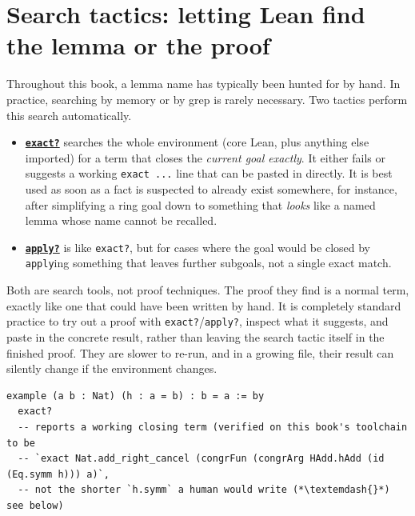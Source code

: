 \section{Search tactics: letting Lean find the lemma or the proof}\label{sec:12-working-efficiently:01-search-tactics:1}

Throughout this book, a lemma name has typically been hunted for by hand. In practice, searching by memory or by grep is rarely necessary. Two tactics perform this search automatically.

\begin{itemize}
\tightlist
\item
  \textbf{\href{https://lean-lang.org/doc/reference/latest/Tactic-Proofs/Tactic-Reference/}{\texttt{exact?}}} searches the whole environment (core Lean, plus anything else imported) for a term that closes the \emph{current goal exactly}. It either fails or suggests a working \texttt{exact ...} line that can be pasted in directly. It is best used as soon as a fact is suspected to already exist somewhere, for instance, after simplifying a ring goal down to something that \emph{looks} like a named lemma whose name cannot be recalled.
\item
  \textbf{\href{https://lean-lang.org/doc/reference/latest/Tactic-Proofs/Tactic-Reference/}{\texttt{apply?}}} is like \texttt{exact?}, but for cases where the goal would be closed by \texttt{apply}ing something that leaves further subgoals, not a single exact match.
\end{itemize}

Both are search tools, not proof techniques. The proof they find is a normal term, exactly like one that could have been written by hand. It is completely standard practice to try out a proof with \texttt{exact?}/\texttt{apply?}, inspect what it suggests, and paste in the concrete result, rather than leaving the search tactic itself in the finished proof. They are slower to re-run, and in a growing file, their result can silently change if the environment changes.

\begin{lstlisting}
example (a b : Nat) (h : a = b) : b = a := by
  exact?
  -- reports a working closing term (verified on this book's toolchain to be
  -- `exact Nat.add_right_cancel (congrFun (congrArg HAdd.hAdd (id (Eq.symm h))) a)`,
  -- not the shorter `h.symm` a human would write (*\textemdash{}*) see below)
\end{lstlisting}

